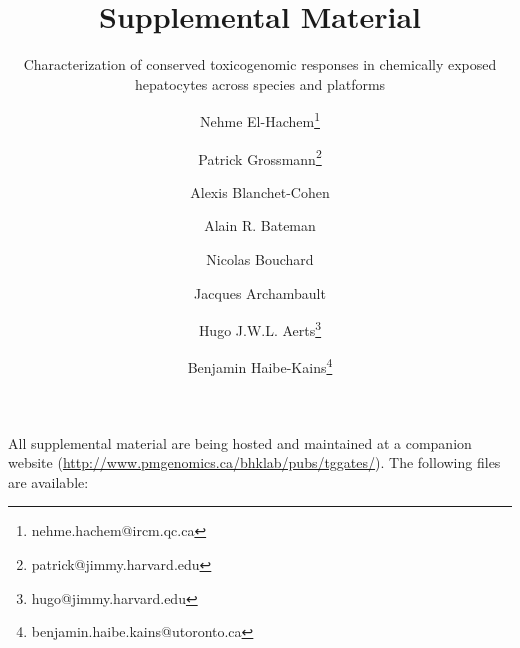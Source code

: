 \documentclass[a4paper,12pt]{scrartcl}
\title{Supplemental Material}
\subtitle{Characterization of conserved toxicogenomic responses in chemically exposed hepatocytes across species and platforms}
\author[i]{Nehme El-Hachem\thanks{nehme.hachem@ircm.qc.ca}}
\author[i]{Patrick Grossmann\thanks{patrick@jimmy.harvard.edu}}
\author[ ]{Alexis Blanchet-Cohen}
\author[ ]{Alain R. Bateman}
\author[ ]{Nicolas Bouchard}
\author[ ]{Jacques Archambault}
\author[ii]{Hugo J.W.L. Aerts\thanks{hugo@jimmy.harvard.edu}}
\author[ii]{Benjamin Haibe-Kains\thanks{benjamin.haibe.kains@utoronto.ca}}
\affil[i]{co-first authors}
\affil[ii]{co-last authors}
\begin{document}
\maketitle

\newpage

All supplemental material are being hosted and maintained at a companion website  (\textcolor{blue}{\url{http://www.pmgenomics.ca/bhklab/pubs/tggates/}}). The following files are available:

\end{document}
